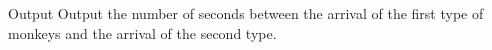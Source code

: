 Output
Output the number of seconds between the arrival of the first type of monkeys and the arrival of the second type.